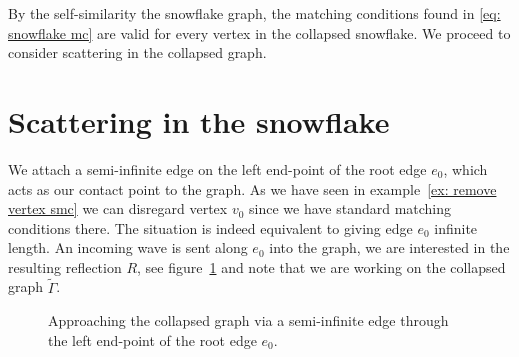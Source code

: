 By the self-similarity the snowflake graph, the matching conditions found in \ref{eq: snowflake mc} are valid for every vertex in the collapsed snowflake. We proceed to consider scattering in the collapsed graph.




\section{Scattering in the snowflake}\label{sec: scattering in the snowflake}

We attach a semi-infinite edge on the left end-point of the root edge $e_0$, which acts as our contact point to the graph. As we have seen in example~\ref{ex: remove vertex smc} we can disregard vertex $v_0$ since we have standard matching conditions there. The situation is indeed equivalent to giving edge $e_0$ infinite length. An incoming wave is sent along $e_0$ into the graph, we are interested in the resulting reflection $R$, see figure~\ref{fig: approaching the collapsed graph} and note that we are working on the collapsed graph $\widetilde{\Gamma}$.

\begin{figure}[!h]
  \centering
  \caption{Approaching the collapsed graph via a semi-infinite edge through the left end-point of the root edge $e_0$.}
  \label{fig: approaching the collapsed graph}
\end{figure}


